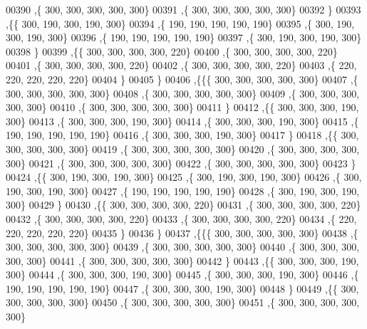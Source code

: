 \begin{DoxyCode}
00390    ,\{   300,   300,   300,   300,   300\}
00391    ,\{   300,   300,   300,   300,   300\}
00392    \}
00393   ,\{\{   300,   190,   300,   190,   300\}
00394    ,\{   190,   190,   190,   190,   190\}
00395    ,\{   300,   190,   300,   190,   300\}
00396    ,\{   190,   190,   190,   190,   190\}
00397    ,\{   300,   190,   300,   190,   300\}
00398    \}
00399   ,\{\{   300,   300,   300,   300,   220\}
00400    ,\{   300,   300,   300,   300,   220\}
00401    ,\{   300,   300,   300,   300,   220\}
00402    ,\{   300,   300,   300,   300,   220\}
00403    ,\{   220,   220,   220,   220,   220\}
00404    \}
00405   \}
00406  ,\{\{\{   300,   300,   300,   300,   300\}
00407    ,\{   300,   300,   300,   300,   300\}
00408    ,\{   300,   300,   300,   300,   300\}
00409    ,\{   300,   300,   300,   300,   300\}
00410    ,\{   300,   300,   300,   300,   300\}
00411    \}
00412   ,\{\{   300,   300,   300,   190,   300\}
00413    ,\{   300,   300,   300,   190,   300\}
00414    ,\{   300,   300,   300,   190,   300\}
00415    ,\{   190,   190,   190,   190,   190\}
00416    ,\{   300,   300,   300,   190,   300\}
00417    \}
00418   ,\{\{   300,   300,   300,   300,   300\}
00419    ,\{   300,   300,   300,   300,   300\}
00420    ,\{   300,   300,   300,   300,   300\}
00421    ,\{   300,   300,   300,   300,   300\}
00422    ,\{   300,   300,   300,   300,   300\}
00423    \}
00424   ,\{\{   300,   190,   300,   190,   300\}
00425    ,\{   300,   190,   300,   190,   300\}
00426    ,\{   300,   190,   300,   190,   300\}
00427    ,\{   190,   190,   190,   190,   190\}
00428    ,\{   300,   190,   300,   190,   300\}
00429    \}
00430   ,\{\{   300,   300,   300,   300,   220\}
00431    ,\{   300,   300,   300,   300,   220\}
00432    ,\{   300,   300,   300,   300,   220\}
00433    ,\{   300,   300,   300,   300,   220\}
00434    ,\{   220,   220,   220,   220,   220\}
00435    \}
00436   \}
00437  ,\{\{\{   300,   300,   300,   300,   300\}
00438    ,\{   300,   300,   300,   300,   300\}
00439    ,\{   300,   300,   300,   300,   300\}
00440    ,\{   300,   300,   300,   300,   300\}
00441    ,\{   300,   300,   300,   300,   300\}
00442    \}
00443   ,\{\{   300,   300,   300,   190,   300\}
00444    ,\{   300,   300,   300,   190,   300\}
00445    ,\{   300,   300,   300,   190,   300\}
00446    ,\{   190,   190,   190,   190,   190\}
00447    ,\{   300,   300,   300,   190,   300\}
00448    \}
00449   ,\{\{   300,   300,   300,   300,   300\}
00450    ,\{   300,   300,   300,   300,   300\}
00451    ,\{   300,   300,   300,   300,   300\}

\end{DoxyCode}
